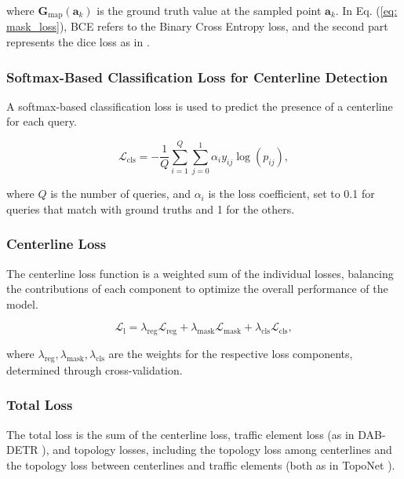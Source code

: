 where \( \mathbf{G}_{\text{map}}(\mathbf{a}_k) \) is the ground truth value at the sampled point \( \mathbf{a}_k \). In Eq. (\ref{eq: mask_loss}), BCE refers to the Binary Cross Entropy loss, and the second part represents the dice loss as in \cite{cheng2022masked}.


\subsubsection{Softmax-Based Classification Loss for Centerline Detection}

A softmax-based classification loss is used to predict the presence of a centerline for each query.

\begin{equation}
\mathcal{L}_{\text{cls}} = -\frac{1}{Q} \sum_{i=1}^{Q} \sum_{j=0}^{1} \alpha_i y_{ij} \log(p_{ij}),
\end{equation}

where \( Q \) is the number of queries, and \( \alpha_i \) is the loss coefficient, set to 0.1 for queries that match with ground truths and 1 for the others.



\subsubsection{Centerline Loss}
The centerline loss function is a weighted sum of the individual losses, balancing the contributions of each component to optimize the overall performance of the model.

\begin{equation}
\mathcal{L}_{\text{l}} = \lambda_{\text{reg}} \mathcal{L}_{\text{reg}} + \lambda_{\text{mask}} \mathcal{L}_{\text{mask}} + \lambda_{\text{cls}} \mathcal{L}_{\text{cls}},
\end{equation}

where \( \lambda_{\text{reg}}, \lambda_{\text{mask}}, \lambda_{\text{cls}} \) are the weights for the respective loss components, determined through cross-validation.

\subsubsection{Total Loss}
The total loss is the sum of the centerline loss, traffic element loss (as in DAB-DETR \cite{liu2022dabdetr}), and topology losses, including the topology loss among centerlines and the topology loss between centerlines and traffic elements (both as in TopoNet \cite{li2023graph}).

